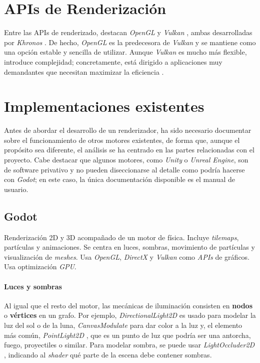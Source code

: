 \section{APIs de Renderización} \label{sec:apis-render}

Entre las APIs de renderizado, destacan \textit{OpenGL} \cite{webKhronosOpenGL} y \textit{Vulkan} \cite{webKhronosOpenGL}, ambas desarrolladas por \textit{Khronos} \cite{webKhronos}. De hecho, \textit{OpenGL} es la predecesora de \textit{Vulkan} y se mantiene como una opción estable y sencilla de utilizar. 
Aunque \textit{Vulkan} es mucho más flexible, introduce complejidad; concretamente, está dirigido a aplicaciones muy demandantes que necesitan maximizar la eficiencia \cite{webNvidiaOglVulkan}.

\section{Implementaciones existentes} \label{sec:current-implementations}
Antes de abordar el desarrollo de un renderizador, ha sido necesario documentar sobre el funcionamiento de otros motores existentes, de forma que, aunque el propósito sea diferente, el análisis se ha centrado en las partes relacionadas con el proyecto. Cabe destacar que algunos motores, como \textit{Unity} o \textit{Unreal Engine}, son de software privativo y no pueden diseccionarse al detalle como podría hacerse con \textit{Godot}; en este caso, la única documentación disponible es el manual de usuario.

\subsection{Godot}

Renderización 2D \cite{webGodot2DRendererDocs} y 3D \cite{webGodot3DRendererDocs} acompañado de un motor de física. Incluye \textit{tilemaps}, partículas y animaciones. Se centra en luces, sombras, movimiento de partículas y visualización de \textit{meshes}. Usa \textit{OpenGL}, \textit{DirectX} y \textit{Vulkan} como \textit{APIs} de gráficos. Usa optimización \textit{GPU}. 

\paragraph{Luces y sombras}
Al igual que el resto del motor, las mecánicas de iluminación consisten en \textbf{nodos} o \textbf{vértices} en un grafo. Por ejemplo, \textit{DirectionalLight2D} \cite{webGodotDL2D} es usado para modelar la luz del sol o de la luna, \textit{CanvasModulate} \cite{webGodotCM} para dar color a la luz y, el elemento más común, \textit{PointLight2D} \cite{webGodotPL2D}, que es un punto de luz que podría ser una antorcha, fuego, proyectiles o similar. Para modelar sombra, se puede usar \textit{LightOccluder2D} \cite{webGodotLO2D}, indicando al \textit{shader} qué parte de la escena debe contener sombras.

